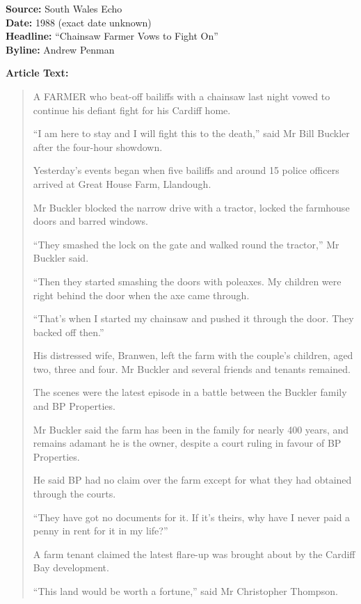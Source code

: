 \documentclass[11pt,a4paper]{article}
\begin{document}
\begin{newspaperquote}
\textbf{Source:} South Wales Echo\\
\textbf{Date:} 1988 (exact date unknown)\\
\textbf{Headline:} ``Chainsaw Farmer Vows to Fight On''\\
\textbf{Byline:} Andrew Penman
\end{newspaperquote}

\textbf{Article Text:}

\begin{quote}
A FARMER who beat-off bailiffs with a chainsaw last night vowed to continue his defiant fight for his Cardiff home.

``I am here to stay and I will fight this to the death,'' said Mr Bill Buckler after the four-hour showdown.

Yesterday's events began when five bailiffs and around 15 police officers arrived at Great House Farm, Llandough.

Mr Buckler blocked the narrow drive with a tractor, locked the farmhouse doors and barred windows.

``They smashed the lock on the gate and walked round the tractor,'' Mr Buckler said.

``Then they started smashing the doors with poleaxes. My children were right behind the door when the axe came through.

``That's when I started my chainsaw and pushed it through the door. They backed off then.''

His distressed wife, Branwen, left the farm with the couple's children, aged two, three and four. Mr Buckler and several friends and tenants remained.

The scenes were the latest episode in a battle between the Buckler family and BP Properties.

Mr Buckler said the farm has been in the family for nearly 400 years, and remains adamant he is the owner, despite a court ruling in favour of BP Properties.

He said BP had no claim over the farm except for what they had obtained through the courts.

``They have got no documents for it. If it's theirs, why have I never paid a penny in rent for it in my life?''

A farm tenant claimed the latest flare-up was brought about by the Cardiff Bay development.

``This land would be worth a fortune,'' said Mr Christopher Thompson.


\end{quote}
\end{document}
